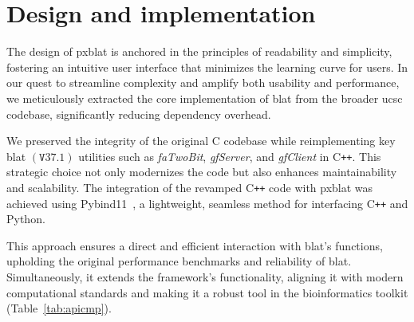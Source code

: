 \documentclass[10pt,letterpaper]{article}
\begin{document}
\section*{Design and implementation}
The design of \gls{pxblat} is anchored in the principles of readability and simplicity, fostering an intuitive user interface that minimizes the learning curve for users.
In our quest to streamline complexity and amplify both usability and performance, we meticulously extracted the core implementation of \gls{blat} from the broader \gls{ucsc} codebase, significantly reducing dependency overhead.

We preserved the integrity of the original C codebase while reimplementing key \gls{blat} \(\left(\mathtt{V}37.1\right)\) utilities such as \emph{faTwoBit}, \emph{gfServer}, and \emph{gfClient} in C\texttt{++}.
This strategic choice not only modernizes the code but also enhances maintainability and scalability.
The integration of the revamped C\texttt{++} code with \gls{pxblat} was achieved using Pybind11~\cite{pybind11}, a lightweight, seamless method for interfacing C\texttt{++} and Python.

This approach ensures a direct and efficient interaction with \gls{blat}'s functions, upholding the original performance benchmarks and reliability of \gls{blat}.
Simultaneously, it extends the framework's functionality, aligning it with modern computational standards and making it a robust tool in the bioinformatics toolkit (Table~\ref{tab:apicmp}).
\end{document}
